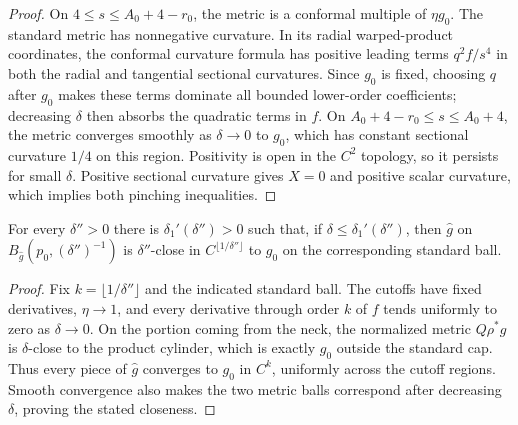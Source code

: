 \begin{proof}
On $4\le s\le A_0+4-r_0$, the metric is a conformal multiple of
$\eta g_0$.  The standard metric has nonnegative curvature.  In its radial
warped-product coordinates, the conformal curvature formula has positive
leading terms $q^2f/s^4$ in both the radial and tangential sectional
curvatures.  Since $g_0$ is fixed, choosing $q$ after $g_0$ makes these
terms dominate all bounded lower-order coefficients; decreasing $\delta$
then absorbs the quadratic terms in $f$.  On
$A_0+4-r_0\le s\le A_0+4$, the metric converges smoothly as
$\delta\to0$ to $g_0$, which has constant sectional curvature $1/4$ on
this region.  Positivity is open in the $C^2$ topology, so it persists for
small $\delta$.  Positive sectional curvature gives $X=0$ and positive
scalar curvature, which implies both pinching inequalities.
\end{proof}

\begin{lemma}
\label{lem:local-surgery-standard-cap-convergence}
\notready
For every $\delta''>0$ there is $\delta_1'(\delta'')>0$ such that, if
$\delta\le\delta_1'(\delta'')$, then $\widehat g$ on
$B_{\widehat g}(p_0,(\delta'')^{-1})$ is $\delta''$-close in
$C^{\lfloor1/\delta''\rfloor}$ to $g_0$ on the corresponding standard
ball.
\end{lemma}

\begin{proof}
Fix $k=\lfloor1/\delta''\rfloor$ and the indicated standard ball.  The
cutoffs have fixed derivatives, $\eta\to1$, and every derivative through
order $k$ of $f$ tends uniformly to zero as $\delta\to0$.  On the portion
coming from the neck, the normalized metric $Q\rho^*g$ is
$\delta$-close to the product cylinder, which is exactly $g_0$ outside the
standard cap.  Thus every piece of $\widehat g$ converges to $g_0$ in
$C^k$, uniformly across the cutoff regions.  Smooth convergence also makes
the two metric balls correspond after decreasing $\delta$, proving the
stated closeness.
\end{proof}

